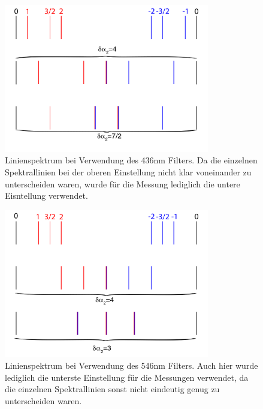 \documentclass[bigchapter,colorback,accentcolor=tud4b,linedtoc,11pt]{tudreport}
\begin{document}
\begin{figure}[H] 
  \centering
     \includegraphics[width=0.8\textwidth]{img/linienspektrum436.png}
     \caption{Linienspektrum bei Verwendung des 436nm Filters. Da die einzelnen
       Spektrallinien bei der oberen Einstellung nicht klar voneinander zu
       unterscheiden waren, wurde für die Messung lediglich die untere
       Eisntellung verwendet.}
  \label{fig:436nmlines}
\end{figure}

\begin{figure}[H] 
  \centering
     \includegraphics[width=0.8\textwidth]{img/linienspektrum546.png}
     \caption{Linienspektrum bei Verwendung des 546nm Filters. Auch hier wurde
       lediglich die unterste Einstellung für die Messungen verwendet, da die
       einzelnen Spektrallinien sonst nicht eindeutig genug zu unterscheiden waren.}
  \label{fig:546nmlines}
\end{figure}
\end{document}

